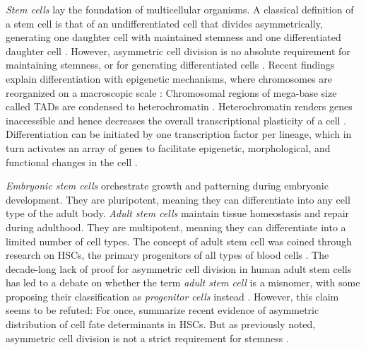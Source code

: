 \emph{Stem cells} lay the foundation of multicellular organisms. A classical
definition of a stem cell is that of an undifferentiated cell that divides
asymmetrically, generating one daughter cell with maintained stemness and one
differentiated daughter cell \cite{cooperCellProliferationDevelopment2000,
shenghuiMechanismsStemCell2009}. However, asymmetric cell division is no
absolute requirement for maintaining stemness, or for generating differentiated cells
\cite{morrisonStemCellsNiches2008, yamashitaPolarityStemCell2010,
shahriyariSymmetricVsAsymmetric2013, nakamuraAsymmetricitySisterCells2018}.
Recent findings explain differentiation with epigenetic mechanisms, where
chromosomes are reorganized on a macroscopic scale
\cite{dixonChromatinArchitectureReorganization2015}: Chromosomal regions of
mega-base size called \acp{TAD}  are condensed to heterochromatin
\cite{ciabrelliChromatinDrivenBehaviorTopologically2015}. Heterochromatin
renders genes inaccessible and hence decreases the overall transcriptional
plasticity of a cell \cite{stanchevaRevisitingHeterochromatinEmbryonic2011,
xieEpigenomicAnalysisMultilineage2013, chenSpatialGenomeReorganization2019}.
Differentiation can be initiated by one transcription factor per lineage, which
in turn activates an array of genes to facilitate epigenetic,
morphological, and functional changes in the cell
\cite{almalkiKeyTranscriptionFactors2016, walewskaMesenchymalStemCells2023}.

\emph{Embryonic stem cells} orchestrate growth and patterning during embryonic
development. They are pluripotent, meaning they can differentiate into any cell
type of the adult body. \emph{Adult stem cells}  maintain tissue homeostasis and repair during
adulthood. They are multipotent, meaning they can differentiate into a limited
number of cell types. The concept of adult stem cell was coined through research
on \acp{HSC}, the primary progenitors of all types of blood cells
\cite{leeHematopoieticStemCells2019, nunesAsymmetricCellDivision2024}. The
decade-long lack of proof for asymmetric cell division in human adult stem cells
has led to a debate on whether the term \emph{adult stem cell} is a misnomer,
with some proposing their classification as \emph{progenitor cells} instead
\cite{bhartiyaStemCellsProgenitors2015}. However, this claim seems to be
refuted: For once, \citet{nunesAsymmetricCellDivision2024} summarize recent
evidence of asymmetric distribution of cell fate determinants in \acp{HSC}. But
as previously noted, asymmetric cell division is not a strict requirement for
stemness \cite{shahriyariSymmetricVsAsymmetric2013}.

